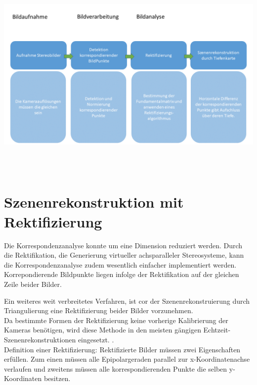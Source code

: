 \begin{minipage}{\linewidth}
	\centering
	\includegraphics[width=.8\linewidth]{images/NEU_Rektifizierung_Arbeitsprozess.png}
\end{minipage}\\ \\



\section{Szenenrekonstruktion mit Rektifizierung}


Die Korrespondenzanalyse konnte um eine Dimension reduziert werden. Durch die
Rektifikation, die Generierung virtueller achsparalleler Stereosysteme, kann die Korrespondenzanalyse
zudem wesentlich einfacher implementiert werden. Korrepondierende
Bildpunkte liegen infolge der Rektifikation auf der gleichen Zeile beider Bilder.\cite{phdextrinsicPara}

Ein weiteres weit verbreitetes Verfahren, ist cor der Szenenrekonstruierung durch Triangulierung eine Rektifizierung beider Bilder vorzunehmen\cite{MatlabRec,ZZ,Javier,Fusiello}.\\ 

Da bestimmte Formen der Rektifizierung keine vorherige Kalibrierung der Kameras benötigen, wird diese Methode in den meisten gängigen Echtzeit-Szenenrekonstruktionen eingesetzt. \cite{Fusiello,Javier,R.H.}.\\



Definition einer Rektifizierung:
Rektifizierte Bilder müssen zwei Eigenschaften erfüllen. Zum einen müssen alle Epipolargeraden parallel zur x-Koordinatenachse verlaufen und zweitens müssen alle korrespondierenden Punkte die selben y-Koordinaten besitzen\cite{ZZ}.


